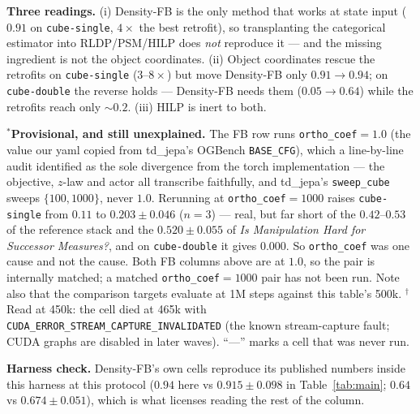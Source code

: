 \documentclass[10pt]{article}
\begin{document}
\begin{table}[h]
\vspace{4pt}
\parbox{\textwidth}{\footnotesize
\textbf{Three readings.} (i) Density-FB is the only method that works at state input
($0.91$ on \texttt{cube-single}, $4\times$ the best retrofit), so transplanting the
categorical estimator into RLDP/PSM/HILP does \emph{not} reproduce it --- and the missing
ingredient is not the object coordinates. (ii) Object coordinates rescue the retrofits on
\texttt{cube-single} ($3$--$8\times$) but move Density-FB only $0.91 \to 0.94$; on
\texttt{cube-double} the reverse holds --- Density-FB needs them ($0.05 \to 0.64$) while the
retrofits reach only ${\sim}0.2$. (iii) HILP is inert to both.

\smallskip
$^{\ast}$\textbf{Provisional, and still unexplained.} The FB row runs
\texttt{ortho\_coef}$=1.0$ (the value our yaml copied from td\_jepa's OGBench
\texttt{BASE\_CFG}), which a line-by-line audit identified as the sole divergence from the
torch implementation --- the objective, $z$-law and actor all transcribe faithfully, and
td\_jepa's \texttt{sweep\_cube} sweeps $\{100,1000\}$, never $1.0$. Rerunning at
\texttt{ortho\_coef}$=1000$ raises \texttt{cube-single} from $0.11$ to
$\mathbf{0.203\pm0.046}$ ($n{=}3$) --- real, but far short of the $0.42$--$0.53$ of the
reference stack and the $0.520\pm0.055$ of \emph{Is Manipulation Hard for Successor
Measures?}, and on \texttt{cube-double} it gives $0.000$. So \texttt{ortho\_coef} was one
cause and not the cause. Both FB columns above are at $1.0$, so the pair is internally
matched; a matched \texttt{ortho\_coef}$=1000$ pair has not been run. Note also that the
comparison targets evaluate at 1M steps against this table's 500k.
$^{\dagger}$Read at 450k: the cell died at 465k with
\texttt{CUDA\_ERROR\_STREAM\_CAPTURE\_INVALIDATED} (the known stream-capture fault; CUDA
graphs are disabled in later waves). ``---'' marks a cell that was never run.

\smallskip
\textbf{Harness check.} Density-FB's own cells reproduce its published numbers inside this
harness at this protocol ($0.94$ here vs $0.915\pm0.098$ in Table~\ref{tab:main}; $0.64$ vs
$0.674\pm0.051$), which is what licenses reading the rest of the column.}
\end{table}
\end{document}
